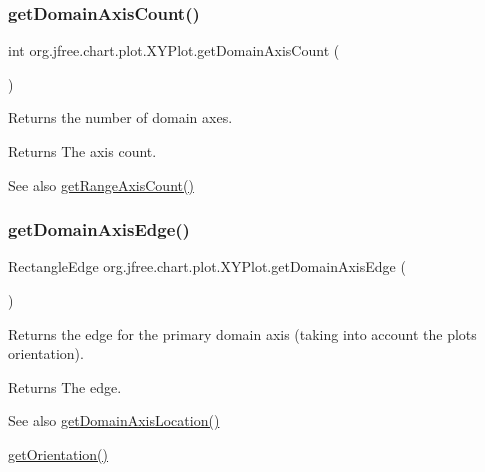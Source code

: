 \subsubsection{\texorpdfstring{get\+Domain\+Axis\+Count()}{getDomainAxisCount()}}
{\footnotesize\ttfamily int org.\+jfree.\+chart.\+plot.\+X\+Y\+Plot.\+get\+Domain\+Axis\+Count (\begin{DoxyParamCaption}{ }\end{DoxyParamCaption})}

Returns the number of domain axes.

\begin{DoxyReturn}{Returns}
The axis count.
\end{DoxyReturn}
\begin{DoxySeeAlso}{See also}
\mbox{\hyperlink{classorg_1_1jfree_1_1chart_1_1plot_1_1_x_y_plot_aa5e28a20e931bcf9df88489edad70aa5}{get\+Range\+Axis\+Count()}} 
\end{DoxySeeAlso}
\mbox{\label{classorg_1_1jfree_1_1chart_1_1plot_1_1_x_y_plot_a6d2e12b65dddef26cfade5a8322f1fcd}} 
\subsubsection{\texorpdfstring{get\+Domain\+Axis\+Edge()}{getDomainAxisEdge()}\hspace{0.1cm}{\footnotesize\ttfamily [1/2]}}
{\footnotesize\ttfamily Rectangle\+Edge org.\+jfree.\+chart.\+plot.\+X\+Y\+Plot.\+get\+Domain\+Axis\+Edge (\begin{DoxyParamCaption}{ }\end{DoxyParamCaption})}

Returns the edge for the primary domain axis (taking into account the plot\textquotesingle{}s orientation).

\begin{DoxyReturn}{Returns}
The edge.
\end{DoxyReturn}
\begin{DoxySeeAlso}{See also}
\mbox{\hyperlink{classorg_1_1jfree_1_1chart_1_1plot_1_1_x_y_plot_a10a59b35a61cf4cd839e23f498ab674e}{get\+Domain\+Axis\+Location()}} 

\mbox{\hyperlink{classorg_1_1jfree_1_1chart_1_1plot_1_1_x_y_plot_a5b0c5d43d190ffdfc7cdee341c0e6990}{get\+Orientation()}} 
\end{DoxySeeAlso}
\mbox{\label{classorg_1_1jfree_1_1chart_1_1plot_1_1_x_y_plot_a24041c33028c5423553b1953ca9fb017}} 
